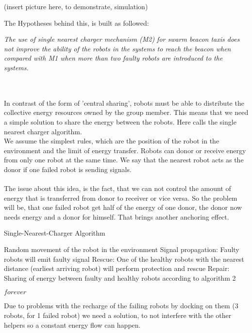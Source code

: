\documentclass[
	a4paper,
	article,
	pagesize,
	pdftex,
	12pt,
	english,
	fleqn,
	final,
	]{scrartcl}
\begin{document}
(insert picture here, to demonstrate, simulation)\\
\begin{minipage}[c][3cm]{\textwidth}
	The Hypotheses behind this, is built as followed:
	\begin{displayquote}
		\textit{The use of single nearest charger mechanism (M2) for swarm beacon
		taxis does not improve the ability of the robots in the systems to
		reach the beacon when compared with M1 when more than two faulty
		robots are introduced to the systems.}
	\end{displayquote}
\end{minipage}\\
\ \\
In contrast of the form of 'central sharing', robots must be able to distribute the collective energy resources owned by the group member. This means that we need a simple solution to share the energy between the robots. Here calls the single nearest charger algorithm.\\
We assume the simplest rules, which are the position of the robot in the environment and the limit of energy transfer. Robots can donor or receive energy from only one robot at the same time. We say that the nearest robot acts as the donor if one failed robot is sending signals.\\
\ \\
The issue about this idea, is the fact, that we can not control the amount of energy that is transferred from donor to receiver or vice versa. So the problem will be, that one failed robot get half of the energy of one donor, the donor now needs energy and a donor for himself. That brings another anchoring effect.

\begin{algorithm}
	\caption{Single-Nearest-Charger Algorithm}
	\begin{algorithmic}[1]
		\Repeat 
		\State \parbox[t]{0.8\textwidth}{Random movement of the robot in the environment Signal propagation: Faulty robots will emit faulty signal Rescue: One of the healthy robots with the nearest distance (earliest arriving robot) will perform protection and rescue Repair: Sharing of energy between faulty and healthy robots according to algorithm 2} 
		\Until $forever$
		\EndProcedure
	\end{algorithmic}
\end{algorithm}

Due to problems with the recharge of the failing robots by docking on them (3 robots, 
for 1 failed robot) we need a solution, to not interfere with the other helpers so a constant energy flow can happen.
\end{document}
